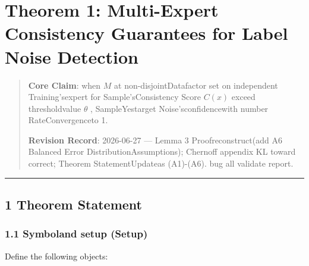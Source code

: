 \documentclass[
  12pt,
]{article}
\author{SCX}
\date{2026}
\begin{document}
\section{Theorem 1: Multi-Expert Consistency Guarantees for Label Noise
Detection}\label{theorem-1-multi-expert-consistency-guarantees-for-label-noise-detection}

\begin{quote}
\textbf{Core Claim}: when  \(M\)
at non-disjointDatafactor set on independent Training'sexpert for Sample'sConsistency Score \(C(x)\)
exceed thresholdvalue  \(\theta\) , SampleYestarget Noise'sconfidencewith number RateConvergenceto  1. 

\textbf{Revision Record}: 2026-06-27 --- Lemma 3 Proofreconstruct(add A6
Balanced Error DistributionAssumptions); Chernoff appendix KL toward correct; Theorem StatementUpdateas 
(A1)-(A6).  bug all validate report. 
\end{quote}

\begin{center}\rule{0.5\linewidth}{0.5pt}\end{center}

\subsection{1 Theorem Statement}\label{ux5b9aux7406ux9648ux8ff0}

\subsubsection{1.1 Symboland setup
(Setup)}\label{ux7b26ux53f7ux4e0eux8bbeux5b9a-setup}

Define the following objects:
\end{document}
